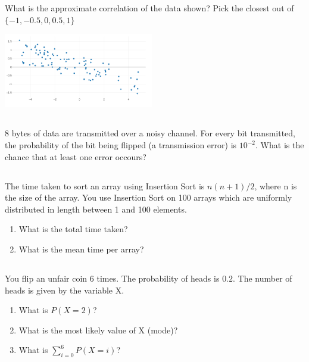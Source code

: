 \documentclass[twocolumn]{article}
\newcommand\mrk[1]{}
\begin{document}
    What is the approximate correlation of the data shown? Pick the closest out of \mbox{$\{-1, -0.5, 0, 0.5, 1\}$ \mrk{1}}

    \includegraphics[width=0.49\textwidth]{correlation}


\subsection{}

    8 bytes of data are transmitted over a noisy channel. For every bit transmitted, the probability of the bit being flipped (a transmission error) is $10^{-2}$. What is the chance that at least one error occours? \mrk{1}

\subsection{}

    The time taken to sort an array using Insertion Sort is $n(n+1)/2$, where n is the size of the array. You use Insertion Sort on 100 arrays which are uniformly distributed in length between 1 and 100 elements.

    \begin{enumerate}
        \item What is the total time taken?  \mrk{1}
        \item What is the mean time per array?  \mrk{1}
    \end{enumerate}

\subsection{}

You flip an unfair coin 6 times. The probability of heads is $0.2$. The number of heads is given by the variable X.

\begin{enumerate}
    \item What is $P(X=2)$? \mrk{1}
    \item What is the most likely value of X (mode)? \mrk{1}
    \item What is $\sum_{i=0}^6 P(X = i)$? \mrk{1}
\end{enumerate}
\end{document}
